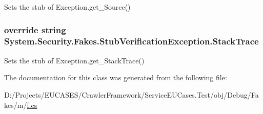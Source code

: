 Sets the stub of Exception.\-get\-\_\-\-Source()

\hypertarget{class_system_1_1_security_1_1_fakes_1_1_stub_verification_exception_aaf6b75e660af14f9909b1c696e88abe8}{
\subsubsection[{Stack\-Trace}]{\setlength{\rightskip}{0pt plus 5cm}override string System.\-Security.\-Fakes.\-Stub\-Verification\-Exception.\-Stack\-Trace\hspace{0.3cm}{\ttfamily [get]}}}\label{class_system_1_1_security_1_1_fakes_1_1_stub_verification_exception_aaf6b75e660af14f9909b1c696e88abe8}


Sets the stub of Exception.\-get\-\_\-\-Stack\-Trace()



The documentation for this class was generated from the following file\-:\begin{DoxyCompactItemize}
\item 
D\-:/\-Projects/\-E\-U\-C\-A\-S\-E\-S/\-Crawler\-Framework/\-Service\-E\-U\-Cases.\-Test/obj/\-Debug/\-Fakes/m/\hyperlink{m_2f_8cs}{f.\-cs}\end{DoxyCompactItemize}
